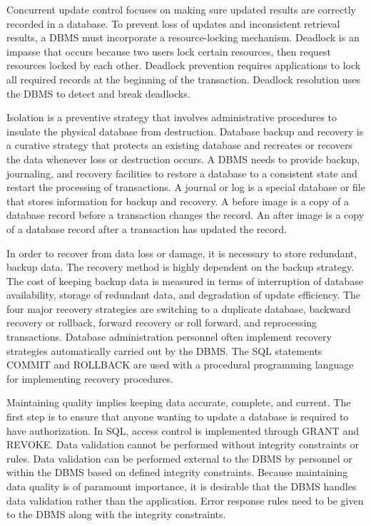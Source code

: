 \documentclass[
]{article}
\begin{document}
Concurrent update control focuses on making sure updated results are
correctly recorded in a database. To prevent loss of updates and
inconsistent retrieval results, a DBMS must incorporate a
resource-locking mechanism. Deadlock is an impasse that occurs because
two users lock certain resources, then request resources locked by each
other. Deadlock prevention requires applications to lock all required
records at the beginning of the transaction. Deadlock resolution uses
the DBMS to detect and break deadlocks.

Isolation is a preventive strategy that involves administrative
procedures to insulate the physical database from destruction. Database
backup and recovery is a curative strategy that protects an existing
database and recreates or recovers the data whenever loss or destruction
occurs. A DBMS needs to provide backup, journaling, and recovery
facilities to restore a database to a consistent state and restart the
processing of transactions. A journal or log is a special database or
file that stores information for backup and recovery. A before image is
a copy of a database record before a transaction changes the record. An
after image is a copy of a database record after a transaction has
updated the record.

In order to recover from data loss or damage, it is necessary to store
redundant, backup data. The recovery method is highly dependent on the
backup strategy. The cost of keeping backup data is measured in terms of
interruption of database availability, storage of redundant data, and
degradation of update efficiency. The four major recovery strategies are
switching to a duplicate database, backward recovery or rollback,
forward recovery or roll forward, and reprocessing transactions.
Database administration personnel often implement recovery strategies
automatically carried out by the DBMS. The SQL statements COMMIT and
ROLLBACK are used with a procedural programming language for
implementing recovery procedures.

Maintaining quality implies keeping data accurate, complete, and
current. The first step is to ensure that anyone wanting to update a
database is required to have authorization. In SQL, access control is
implemented through GRANT and REVOKE. Data validation cannot be
performed without integrity constraints or rules. Data validation can be
performed external to the DBMS by personnel or within the DBMS based on
defined integrity constraints. Because maintaining data quality is of
paramount importance, it is desirable that the DBMS handles data
validation rather than the application. Error response rules need to be
given to the DBMS along with the integrity constraints.
\end{document}
